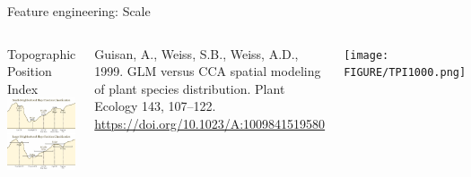 \begin{frame}{Feature engineering: \alert{Scale}}
\begin{columns}
 \column{5cm}
 \begin{block}{Topographic Position Index}
\centering\includegraphics[width=1\textwidth]{FIGURE/TPI.png}
\end{block}

\raggedright\tiny Guisan, A., Weiss, S.B., Weiss, A.D., 1999. GLM versus CCA spatial modeling of plant species distribution. Plant Ecology 143, 107–122. \url{https://doi.org/10.1023/A:1009841519580   }

\column{5cm}
\centering\texttt{[image: FIGURE/TPI1000.png]}

\end{columns}
\end{frame}

